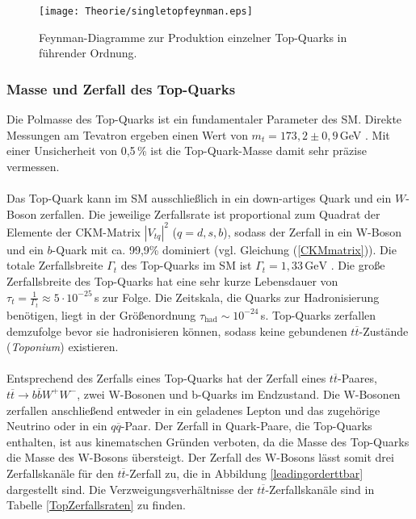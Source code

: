 \begin{figure}[ht]
	\centering
	\texttt{[image: Theorie/singletopfeynman.eps]}
	\caption[Feynman-Diagramme zur Produktion einzelner Top-Quarks in f\"uhrender Ordnung]{Feynman-Diagramme zur Produktion einzelner Top-Quarks in f\"uhrender Ordnung.}
	\label{singletopprod}
\end{figure}




\subsubsection{Masse und Zerfall des Top-Quarks}
\label{massanddecaytop}
Die Polmasse des Top-Quarks ist ein fundamentaler Parameter des SM. Direkte Messungen am Tevatron ergeben einen Wert von $m_{t}=173,2\pm 0,9$\,GeV \cite{Lancaster:2011wr}. Mit einer Unsicherheit von 0,5\,\% ist die Top-Quark-Masse damit sehr pr\"azise vermessen.
\\
\\
Das Top-Quark kann im SM ausschlie\ss{}lich in ein down-artiges Quark und ein $W$-Boson zerfallen. Die jeweilige Zerfallsrate ist proportional zum Quadrat der Elemente der CKM-Matrix $|V_{tq}|^{2}$ ($q=d,s,b$), sodass der Zerfall in ein W-Boson und ein $b$-Quark mit ca. 99,9\% dominiert (vgl. Gleichung (\ref{CKMmatrix})). Die totale Zerfallsbreite $\Gamma_{t}$ des Top-Quarks im SM ist $\Gamma_{t}=1,33\,\text{GeV} $ \cite{Jezabek:1988iv}. Die gro\ss{}e Zerfallsbreite des Top-Quarks hat eine sehr kurze Lebensdauer von $\tau_{t}=\frac{1}{\Gamma_{t}}\approx 5\cdot 10^{-25}$\,s zur Folge. Die Zeitskala, die Quarks zur Hadronisierung ben\"otigen, liegt in der Gr\"o\ss{}enordnung $\tau_{\text{had}}\sim 10^{-24}$\,s. Top-Quarks zerfallen demzufolge bevor sie hadronisieren k\"onnen, sodass keine gebundenen $t\overline{t}$-Zust\"ande (\textit{Toponium}) existieren.\\
\\
Entsprechend des Zerfalls eines Top-Quarks hat der Zerfall eines $t\overline{t}$-Paares, $t\overline{t}\rightarrow b\overline{b}W^{+}W^{-}$, zwei W-Bosonen und b-Quarks im Endzustand. Die W-Bosonen zerfallen anschlie\ss{}end entweder in ein geladenes Lepton und das zugeh\"orige Neutrino oder in ein $q\overline{q}$-Paar. Der Zerfall in Quark-Paare, die Top-Quarks enthalten, ist aus kinematschen Gr\"unden verboten, da die Masse des Top-Quarks die Masse des W-Bosons \"ubersteigt. Der Zerfall des W-Bosons l\"asst somit drei Zerfallskan\"ale f\"ur den $t\overline{t}$-Zerfall zu, die in Abbildung \ref{leadingorderttbar} dargestellt sind. Die Verzweigungsverh\"altnisse der $t\overline{t}$-Zerfallskan\"ale sind in Tabelle \ref{TopZerfallsraten} zu finden.  \\
